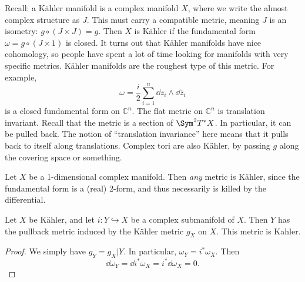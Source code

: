 Recall: a K\"ahler manifold is a complex manifold $X$, where we write the almost complex structure as $J$. This must carry a compatible metric, meaning $J$ is an isometry: $g\circ (J\times J) = g$. Then $X$ is K\"ahler if the fundamental form $\omega =g\circ (J\times 1)$ is closed. It turns out that K\"ahler manifolds have nice cohomology, so people have spent a lot of time looking for manifolds with very specific metrics. K\"ahler manifolds are the roughest type of this metric.
For example,
\[
	\omega =\frac{i}{2} \sum_{i=1}^{n} \dd z_i \wedge \dd \overline{z} _i
\]
is a closed fundamental form on $\mathbb{C} ^n$. The flat metric on $\mathbb{C} ^n$ is translation invariant. Recall that the metric is a section of $\Sym ^2T^*X$. In particular, it can be pulled back. The notion of ``translation invariance'' here means that it pulls back to itself along translations. Complex tori are also K\"ahler, by passing $g$ along the covering space or something.

\begin{example}
	Let $X$ be a 1-dimensional complex manifold. Then \emph{any} metric is K\"ahler, since the fundamental form is a (real) 2-form, and thus necessarily is killed by the differential.
\end{example}

\begin{proposition}\label{prp:5.0.2}
	Let $X$ be K\"ahler, and let $i : Y \hookrightarrow X$ be a complex submanifold of $X$. Then $Y$ has the pullback metric induced by the K\"ahler metric $g_X$ on $X$. This metric is Kahler.
\end{proposition}
\begin{proof}
	We simply have $g_Y = g_X|Y$. In particular, $\omega _Y = i^*\omega _X$. Then
	\[
		\dd \omega _Y = \dd i^*\omega _X = i^*\dd \omega _X = 0
	.\]
\end{proof}

